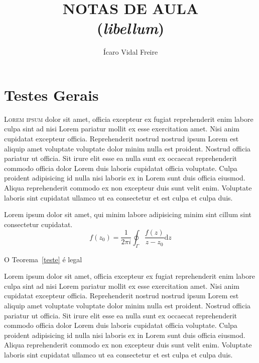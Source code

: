 \documentclass[12pt]{../libellum}
\title{
  \sffamily \bfseries
  NOTAS DE AULA \\
  (\textit{libellum})
}
\author{
  \sffamily
  Ícaro Vidal Freire
}
\date{
  \sffamily 
  2023
}
\begin{document}
 
  \maketitle
  \sumario
%
  \blinddocument
%
  \blindtext {}
  \chapter{Testes Gerais}
   \lettrine[lines=3]{\initial\color{azulUFRB} L}{orem ipsum} dolor sit amet, officia excepteur ex fugiat reprehenderit enim labore culpa sint ad nisi Lorem pariatur mollit ex esse exercitation amet. Nisi anim cupidatat excepteur officia. Reprehenderit nostrud nostrud ipsum Lorem est aliquip amet voluptate voluptate dolor minim nulla est proident. Nostrud officia pariatur ut officia. Sit irure elit esse ea nulla sunt ex occaecat reprehenderit commodo officia dolor Lorem duis laboris cupidatat officia voluptate. Culpa proident adipisicing id nulla nisi laboris ex in Lorem sunt duis officia eiusmod. Aliqua reprehenderit commodo ex non excepteur duis sunt velit enim. Voluptate laboris sint cupidatat ullamco ut ea consectetur et est culpa et culpa duis.



 \begin{teorema}[(de Cauchy)]\label{teste}
    Lorem ipsum dolor sit amet, qui minim labore adipisicing minim sint cillum sint consectetur cupidatat.
      \[
        f(z_0) = \frac{1}{2 \pi i} \oint_{\Gamma} \frac{f(z)}{z - z_0} \mathrm{d} z
      \]
 \end{teorema}

O Teorema~\ref{teste} é legal

 Lorem ipsum dolor sit amet, officia excepteur ex fugiat reprehenderit enim labore culpa sint ad nisi Lorem pariatur mollit ex esse exercitation amet. Nisi anim cupidatat excepteur officia. Reprehenderit nostrud nostrud ipsum Lorem est aliquip amet voluptate voluptate dolor minim nulla est proident. Nostrud officia pariatur ut officia. Sit irure elit esse ea nulla sunt ex occaecat reprehenderit commodo officia dolor Lorem duis laboris cupidatat officia voluptate. Culpa proident adipisicing id nulla nisi laboris ex in Lorem sunt duis officia eiusmod. Aliqua reprehenderit commodo ex non excepteur duis sunt velit enim. Voluptate laboris sint cupidatat ullamco ut ea consectetur et est culpa et culpa duis.
\end{document}
